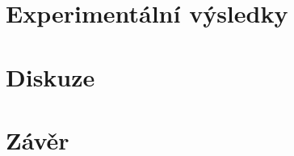 \documentclass[a4paper,10pt]{article}
\begin{document}
\section{Experimentální výsledky}


\section{Diskuze}
\section{Závěr}



\end{document}
